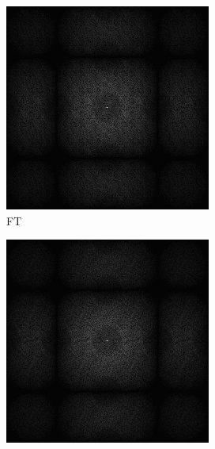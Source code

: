 \begin{figure}[H]
\begin{tcolorbox}[boxrule=4pt,sharp corners=downhill,title=Szene unter Kamerabewegung, fonttitle=\bfseries]
\begin{tcolorbox}[boxrule=4pt,sharp corners=downhill,title=Projektion,colbacktitle=green!50!white, coltitle=black]
\begin{subfigure}[b]{0.2\linewidth}
      \includegraphics[width=\linewidth]{content/TemporalerAlg/Bilder/Reprojection/TemporalRepr/Ausschnitte/Ausschnitt1_FFT.png}
       \caption{FT}
       \label{pic:TemporalRepr_1_FFT}
    \end{subfigure}
    \begin{subfigure}[b]{0.2\linewidth}
      \includegraphics[width=\linewidth]{content/TemporalerAlg/Bilder/Reprojection/TemporalRepr/Ausschnitte/Ausschnitt2_FFT.png}

\end{subfigure}
\end{tcolorbox}
\end{tcolorbox}
\end{figure}

